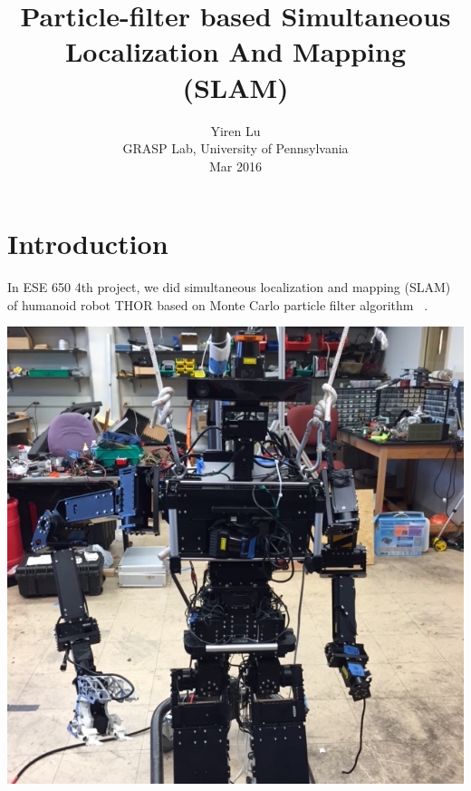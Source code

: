 \documentclass[letterpaper,twocolumn,10pt]{article}
\begin{document}
\date{}

\title{\Large \bf Particle-filter based Simultaneous Localization And Mapping (SLAM)}

\author{
{\rm Yiren Lu}\\
GRASP Lab, University of Pennsylvania\\
Mar 2016
}

\maketitle

\thispagestyle{empty}


\section{Introduction}

In ESE 650 4th project, we did simultaneous localization and mapping (SLAM) of humanoid robot THOR based on Monte Carlo particle filter algorithm ~\cite{thrun2001robust}.
\\
\begin{center}
\includegraphics[scale=0.35]{imgs/robot.JPG}\\
\end{center}
\end{document}
